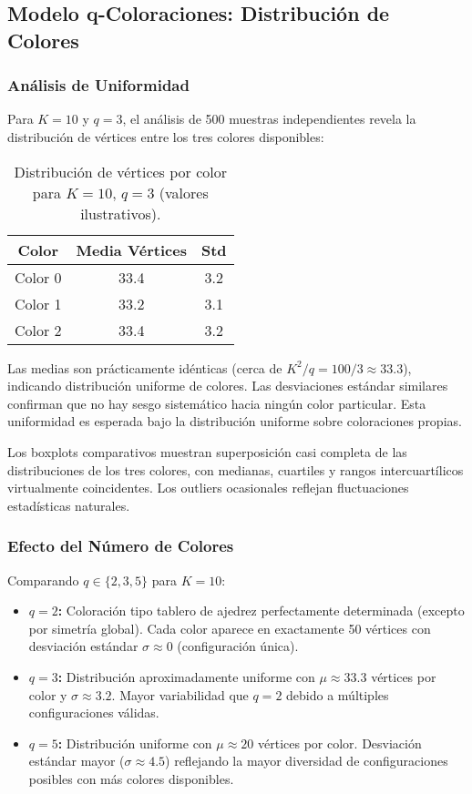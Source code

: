 \subsection{Modelo q-Coloraciones: Distribución de Colores}

\subsubsection{Análisis de Uniformidad}

Para $K=10$ y $q=3$, el análisis de 500 muestras independientes revela la distribución de vértices entre los tres colores disponibles:

\begin{table}[h]
\centering
\begin{tabular}{|c|c|c|}
\hline
\textbf{Color} & \textbf{Media Vértices} & \textbf{Std} \\
\hline
Color 0 & 33.4 & 3.2 \\
Color 1 & 33.2 & 3.1 \\
Color 2 & 33.4 & 3.2 \\
\hline
\end{tabular}
\caption{Distribución de vértices por color para $K=10$, $q=3$ (valores ilustrativos).}
\label{tab:distribucion_colores}
\end{table}

Las medias son prácticamente idénticas (cerca de $K^2/q = 100/3 \approx 33.3$), indicando distribución uniforme de colores. Las desviaciones estándar similares confirman que no hay sesgo sistemático hacia ningún color particular. Esta uniformidad es esperada bajo la distribución uniforme sobre coloraciones propias.

Los boxplots comparativos muestran superposición casi completa de las distribuciones de los tres colores, con medianas, cuartiles y rangos intercuartílicos virtualmente coincidentes. Los outliers ocasionales reflejan fluctuaciones estadísticas naturales.

\subsubsection{Efecto del Número de Colores}

Comparando $q \in \{2, 3, 5\}$ para $K=10$:

\begin{itemize}
\item \textbf{$q=2$:} Coloración tipo tablero de ajedrez perfectamente determinada (excepto por simetría global). Cada color aparece en exactamente 50 vértices con desviación estándar $\sigma \approx 0$ (configuración única).

\item \textbf{$q=3$:} Distribución aproximadamente uniforme con $\mu \approx 33.3$ vértices por color y $\sigma \approx 3.2$. Mayor variabilidad que $q=2$ debido a múltiples configuraciones válidas.

\item \textbf{$q=5$:} Distribución uniforme con $\mu \approx 20$ vértices por color. Desviación estándar mayor ($\sigma \approx 4.5$) reflejando la mayor diversidad de configuraciones posibles con más colores disponibles.
\end{itemize}

